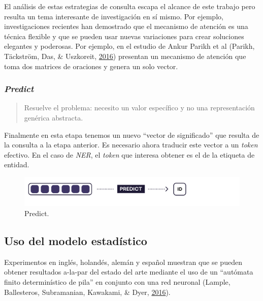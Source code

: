 \documentclass[12pt,a4paper,]{scrartcl}
\begin{document}
El análisis de estas estrategias de consulta escapa el alcance de este trabajo pero resulta un tema interesante de investigación en sí mismo. Por ejemplo, investigaciones recientes han demostrado que el mecanismo de atención es una técnica flexible y que se pueden usar nuevas variaciones para crear soluciones elegantes y poderosas. Por ejemplo, en el estudio de Ankur Parikh et al (Parikh, Täckström, Das, \& Uszkoreit, \protect\hyperlink{ref-parikh-etal-2016-decomposable}{2016}) presentan un mecanismo de atención que toma dos matrices de oraciones y genera un solo vector.

\hypertarget{predict}{%
\subsubsection{\texorpdfstring{\emph{Predict}}{Predict}}\label{predict}}

\begin{quote}
Resuelve el problema: necesito un valor específico y no una representación genérica abstracta.
\end{quote}

Finalmente en esta etapa tenemos un nuevo \enquote{vector de significado} que resulta de la consulta a la etapa anterior. Es necesario ahora traducir este vector a un \emph{token} efectivo. En el caso de \emph{NER}, el \emph{token} que interesa obtener es el de la etiqueta de entidad.

\begin{figure}[H]

{\centering \includegraphics{assets/deep-learning-formula-nlp_predict.pdf} 

}

\caption{Predict.}\label{fig:formula-predict}
\end{figure}

\hypertarget{uso-del-modelo-estaduxedstico}{%
\subsection{Uso del modelo estadístico}\label{uso-del-modelo-estaduxedstico}}

Experimentos en inglés, holandés, alemán y español muestran que se pueden obtener resultados a-la-par del estado del arte mediante el uso de un \enquote{autómata finito determinístico de pila} en conjunto con una red neuronal (Lample, Ballesteros, Subramanian, Kawakami, \& Dyer, \protect\hyperlink{ref-DBLP:journalsux2fcorrux2fLampleBSKD16}{2016}).
\end{document}
